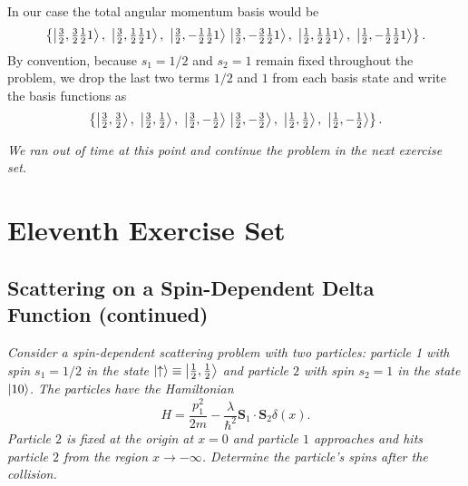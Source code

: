 \documentclass[11pt, a4paper]{article}
\renewcommand{\vec}[1]{\bm{#1}} %
\newcommand{\ua}{\uparrow}  %
\begin{document}
\begin{itemize}
\begin{enumerate}
		In our case the total angular momentum basis would be
		\begin{equation*}
			\left\{ \ket{\tfrac{3}{2}, \tfrac{3}{2} \tfrac{1}{2} 1},\  \ket{\tfrac{3}{2}, \tfrac{1}{2} \tfrac{1}{2} 1},\  \ket{\tfrac{3}{2}, -\tfrac{1}{2} \tfrac{1}{2} 1} \, \ket{\tfrac{3}{2}, -\tfrac{3}{2} \tfrac{1}{2} 1},\ \ket{\tfrac{1}{2}, \tfrac{1}{2} \tfrac{1}{2} 1},\  \ket{\tfrac{1}{2}, -\tfrac{1}{2} \tfrac{1}{2} 1}  \right\}.
		\end{equation*}
		By convention, because $ s_{1} = 1/2 $ and $ s_{2} = 1 $ remain fixed throughout the problem, we drop the last two terms $ 1/2 $ and $ 1 $ from each basis state and write the basis functions as
		\begin{equation*}
			\left\{ \ket{\tfrac{3}{2}, \tfrac{3}{2} },\  \ket{\tfrac{3}{2}, \tfrac{1}{2} },\  \ket{\tfrac{3}{2}, -\tfrac{1}{2} } \, \ket{\tfrac{3}{2}, -\tfrac{3}{2} },\ \ket{\tfrac{1}{2}, \tfrac{1}{2} },\  \ket{\tfrac{1}{2}, -\tfrac{1}{2}}  \right\}.
		\end{equation*}
				
	\end{enumerate}
	\textit{We ran out of time at this point and continue the problem in the next exercise set.}	
\end{itemize}



\section{Eleventh Exercise Set}

\subsection{Scattering on a Spin-Dependent Delta Function (continued)}
\textit{Consider a spin-dependent scattering problem with two particles: particle 1 with spin $ s_{1} = 1/2 $ in the state $ \ket{\ua} \equiv \ket{\tfrac{1}{2}, \tfrac{1}{2}} $ and particle $ 2 $ with spin $ s_{2} = 1 $ in the state $ \ket{10} $. The particles have the Hamiltonian}
\begin{equation*}
	H = \frac{p_{1}^{2}}{2m} - \frac{\lambda}{\hbar^{2}}\vec{S}_{1}\cdot \vec{S}_{2}\delta(x).
\end{equation*}
\textit{Particle $ 2 $ is fixed at the origin at $ x = 0 $ and particle $ 1 $ approaches and hits particle $ 2 $ from the region $ x \to -\infty $. Determine the particle's spins after the collision.}
\end{document}
